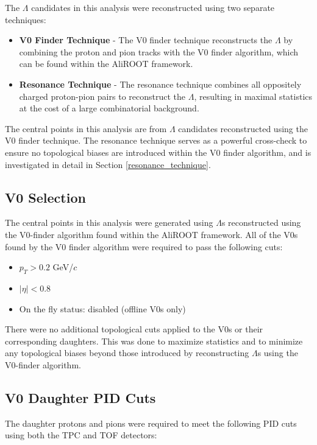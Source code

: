 \documentclass[ALICE,manyauthors]{ALICE_analysis_notes}
\begin{document}
The $\Lambda$ candidates in this analysis were reconstructed using two separate techniques:
\begin{itemize}
	\item \textbf{V0 Finder Technique} - The V0 finder technique reconstructs the $\Lambda$ by combining the proton and pion tracks with the V0 finder algorithm, which can be found within the AliROOT framework.
	\item \textbf{Resonance Technique} - The resonance technique combines all oppositely charged proton-pion pairs to reconstruct the $\Lambda$, resulting in maximal statistics at the cost of a large combinatorial background.
\end{itemize}

The central points in this analysis are from $\Lambda$ candidates reconstructed using the V0 finder technique. The resonance technique serves as a powerful cross-check to ensure no topological biases are introduced within the V0 finder algorithm, and is investigated in detail in Section \ref{resonance_technique}.

\subsection{V0 Selection}
\label{v0_selection}
The central points in this analysis were generated using $\Lambda$s reconstructed using the V0-finder algorithm found within the AliROOT framework. All of the V0s found by the V0 finder algorithm were required to pass the following cuts:

\begin{itemize}
	\item $p_{T} > 0.2$ GeV/$c$
	\item $|\eta| < 0.8$
	\item On the fly status: disabled (offline V0s only)
\end{itemize}

There were no additional topological cuts applied to the V0s or their corresponding daughters. This was done to maximize statistics and to minimize any topological biases beyond those introduced by reconstructing $\Lambda$s using the V0-finder algorithm.

\subsection{V0 Daughter PID Cuts}
\label{v0_daughter_pid}
The daughter protons and pions were required to meet the following PID cuts using both the TPC and TOF detectors:
\end{document}
